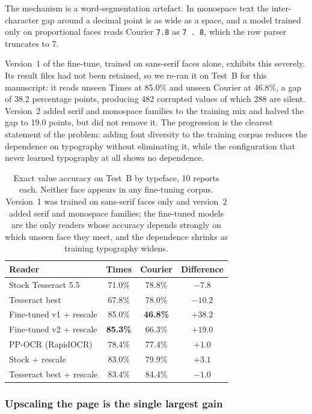 \documentclass[11pt]{article}
\begin{document}
The mechanism is a word-segmentation artefact. In monospace text the inter-character gap around
a decimal point is as wide as a space, and a model trained only on proportional faces reads
Courier \texttt{7.8} as \texttt{7 . 8}, which the row parser truncates to 7.

Version~1 of the fine-tune, trained on sans-serif faces alone, exhibits this severely. Its
result files had not been retained, so we re-ran it on Test~B for this manuscript: it reads
unseen Times at 85.0\% and unseen Courier at 46.8\%, a gap of 38.2 percentage points, producing
482 corrupted values of which 288 are silent. Version~2 added serif and monospace families to
the training mix and halved the gap to 19.0 points, but did not remove it. The progression is
the clearest statement of the problem: adding font diversity to the training corpus reduces the
dependence on typography without eliminating it, while the configuration that never learned
typography at all shows no dependence.

\begin{table}[t]
\centering
\caption{Exact value accuracy on Test~B by typeface, 10 reports each. Neither face appears in
any fine-tuning corpus. Version~1 was trained on sans-serif faces only and version~2 added serif
and monospace families; the fine-tuned models are the only readers whose accuracy depends
strongly on which unseen face they meet, and the dependence shrinks as training typography
widens.}
\label{tab:fonts}
\small
\begin{tabular}{lccc}
\toprule
Reader & Times & Courier & Difference \\
\midrule
Stock Tesseract 5.5      & 71.0\% & 78.8\% & $-7.8$ \\
Tesseract best           & 67.8\% & 78.0\% & $-10.2$ \\
Fine-tuned v1 + rescale  & 85.0\% & \textbf{46.8\%} & $\mathbf{+38.2}$ \\
Fine-tuned v2 + rescale  & \textbf{85.3\%} & 66.3\% & $+19.0$ \\
PP-OCR (RapidOCR)        & 78.4\% & 77.4\% & $+1.0$ \\
Stock + rescale          & 83.0\% & 79.9\% & $+3.1$ \\
Tesseract best + rescale & 83.4\% & 84.4\% & $-1.0$ \\
\bottomrule
\end{tabular}
\end{table}

\subsubsection{Upscaling the page is the single largest gain}
\end{document}
